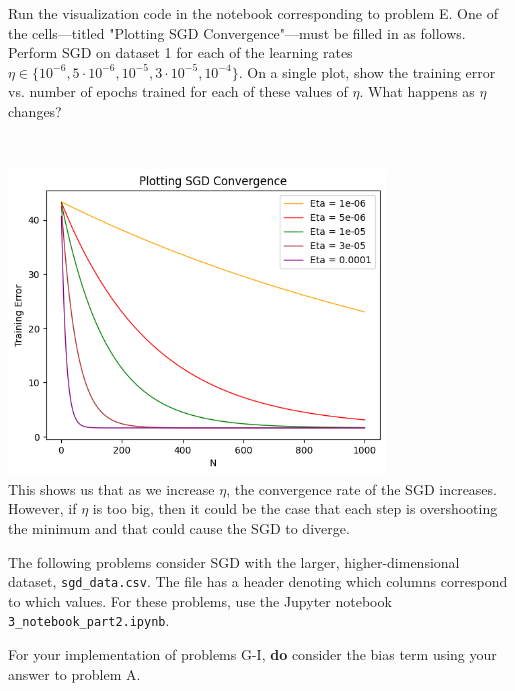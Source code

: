 \begin{problem}[6]
  Run the visualization code in the notebook corresponding to problem E. One of the cells---titled "Plotting SGD Convergence"---must be filled in as follows. Perform SGD on dataset 1 for each of the learning rates $\eta \in \{10^{-6}, 5 \cdot 10^{-6}, 10^{-5}, 3 \cdot 10^{-5}, 10^{-4}\}$. On a single plot, show the training error vs. number of epochs trained for each of these values of $\eta$. What happens as $\eta$ changes?
\end{problem}

\begin{solution}
  \\
  \graphicspath{{images/}}
  \includegraphics[width=10cm]{Problem_3_F.png} \\
  This shows us that as we increase $\eta$, the convergence rate of the SGD increases. However, if $\eta$ is too big, then it could be the case that each step is overshooting the minimum and that could cause the SGD to diverge.
\end{solution}


The following problems consider SGD with the larger, higher-dimensional dataset, \texttt{sgd_data.csv}. The file has a header denoting which columns correspond to which values. For these problems, use the Jupyter notebook \texttt{3_notebook_part2.ipynb}.

For your implementation of problems G-I, \textbf{do} consider the bias term using your answer to problem A.


